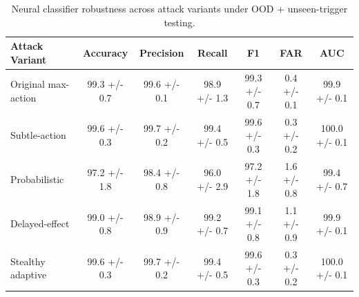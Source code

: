 \begin{table}[t]
\centering
\begin{tabular}{lcccccc}
\hline
Attack Variant & Accuracy & Precision & Recall & F1 & FAR & AUC \\
\hline
Original max-action & 99.3 +/- 0.7 & 99.6 +/- 0.1 & 98.9 +/- 1.3 & 99.3 +/- 0.7 & 0.4 +/- 0.1 & 99.9 +/- 0.1 \\
Subtle-action & 99.6 +/- 0.3 & 99.7 +/- 0.2 & 99.4 +/- 0.5 & 99.6 +/- 0.3 & 0.3 +/- 0.2 & 100.0 +/- 0.1 \\
Probabilistic & 97.2 +/- 1.8 & 98.4 +/- 0.8 & 96.0 +/- 2.9 & 97.2 +/- 1.8 & 1.6 +/- 0.8 & 99.4 +/- 0.7 \\
Delayed-effect & 99.0 +/- 0.8 & 98.9 +/- 0.9 & 99.2 +/- 0.7 & 99.1 +/- 0.8 & 1.1 +/- 0.9 & 99.9 +/- 0.1 \\
Stealthy adaptive & 99.6 +/- 0.3 & 99.7 +/- 0.2 & 99.4 +/- 0.5 & 99.6 +/- 0.3 & 0.3 +/- 0.2 & 100.0 +/- 0.1 \\
\hline
\end{tabular}
\caption{Neural classifier robustness across attack variants under OOD + unseen-trigger testing.}
\label{tab:attack_variant_robustness}
\end{table}
